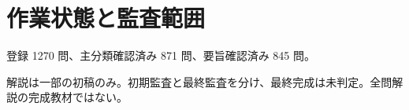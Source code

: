 \chapter{作業状態と監査範囲}
登録 1270 問、主分類確認済み 871 問、要旨確認済み 845 問。
\par 解説は一部の初稿のみ。初期監査と最終監査を分け、最終完成は未判定。全問解説の完成教材ではない。
